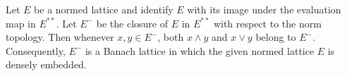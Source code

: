 Let $E$ be a normed lattice and identify $E$ with its image under the evaluation map in $E^{**}$. Let $E^-$ be the closure of $E$ in $E^{**}$ with respect to the norm topology. Then whenever $x, y \in E^-$, both $x \wedge y$ and $x \vee y$ belong to $E^-$. Consequently, $E^-$ is a Banach lattice in which the given normed lattice $E$ is densely embedded.
